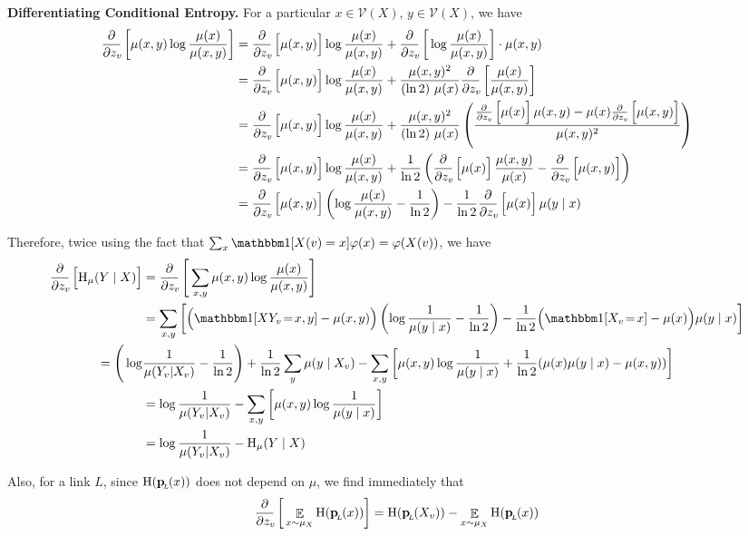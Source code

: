 \documentclass{article}
\newcommand{\bp}[1][L]{\mat{p}_{\!_#1\!}}
\newcommand{\V}{\mathcal V}
\begin{document}
	\textbf{Differentiating Conditional Entropy.}
	For a particular $x \in \V(X)$, $y \in \V(X)$, we have
	\begin{align*}
		\pz{\mu(x,y) \log \frac{\mu(x)}{\mu(x,y)}}
		&= \pz{\mu(x,y)} \log \frac{\mu(x)}{\mu(x,y)} + \pz{\log \frac{\mu(x)}{\mu(x,y)}} \cdot \mu(x,y) \\
		&= \pz{\mu(x,y)} \log \frac{\mu(x)}{\mu(x,y)} + \frac{\mu(x,y)^2}{(\ln 2)\ \mu(x) } \pz{\frac{\mu(x)}{\mu(x,y)}} \\
		&= \pz{\mu(x,y)} \log \frac{\mu(x)}{\mu(x,y)} + \frac{\mu(x,y)^2}{(\ln 2)\ \mu(x) } \left(\frac{ \pz{\mu(x)} \mu(x,y) - \mu(x) \pz{\mu(x,y)}}{\mu(x,y)^2} \right) \\
		&= \pz{\mu(x,y)} \log \frac{\mu(x)}{\mu(x,y)} + \frac{1}{\ln 2} \left( \pz{\mu(x)} \frac{\mu(x,y)}{\mu(x)} - \pz{\mu(x,y)} \right) \\
		&= \pz{\mu(x,y)} \left(\log \frac{\mu(x)}{\mu(x,y)} - \frac{1}{\ln 2}\right) -  \frac{1}{\ln 2} \pz{\mu(x)} \mu(y \mid x) \\
	\end{align*}
	
	Therefore, twice using the fact that $\sum_x \mathbbm1[X(v) = x]\varphi(x) = \varphi(X(v))$, we have
	\begin{align*}
		\pz{\H_\mu(Y \mid X)} &= \pz{\sum_{x,y}\mu(x,y) \log \frac{\mu(x)}{\mu(x,y)}} \\
			&= \sum_{x,y} \left[ \Big(\mathbbm1[XY_v \!=\! x,y] - \mu(x,y)\Big)\left(\log \frac{1}{\mu(y \mid x)} - \frac{1}{\ln 2}\right) -  \frac{1}{\ln 2} \Big(\mathbbm1[X_v \!=\! x] - \mu(x)\Big) \mu(y \mid x) \right] \\
			= \Bigg(\log& \frac{1}{\mu(Y_v | X_v)} - \frac{1}{\ln 2}\Bigg)  + \frac{1}{\ln 2} \sum_{y} \mu(y \mid X_v) - \sum_{x,y} \left[\mu(x,y) \log\frac{1}{\mu(y\mid x)} + \frac{1}{\ln2} (\mu(x)\mu(y\mid x) - \mu(x,y)) \right] \\
			&= \log \frac{1}{\mu(Y_v | X_v)} - \sum_{x,y} \left[\mu(x,y) \log\frac{1}{\mu(y\mid x)} \right] \\
			&= \log \frac{1}{\mu(Y_v | X_v)} - \H_\mu(Y \mid X)
	\end{align*}
	
	Also, for a link $L$, since $\H(\bp(x))$ does not depend on $\mu$, we find immediately that 
	\[\pz{ \E_{x \sim \mu_X} \H(\bp(x)) }  = \H(\bp(X_v)) - \E_{x \sim \mu_X} \H(\bp(x))  \] 
	
\end{document}
